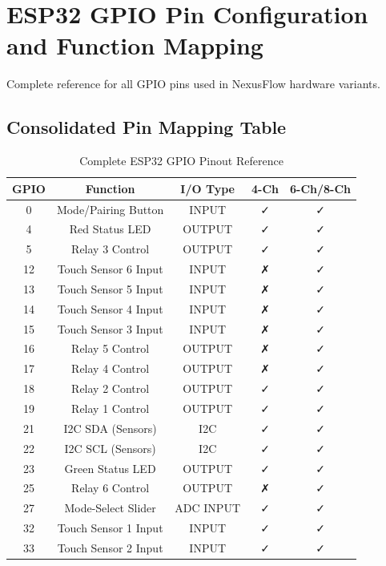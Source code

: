 \section{ESP32 GPIO Pin Configuration and Function Mapping}

Complete reference for all GPIO pins used in NexusFlow hardware variants.

\subsection{Consolidated Pin Mapping Table}

\begin{table}[H]
\centering
\caption{Complete ESP32 GPIO Pinout Reference}
\label{tbl:gpio_reference}
\begin{tabular}{|c|c|c|c|c|}
\hline
\textbf{GPIO} & \textbf{Function} & \textbf{I/O Type} & \textbf{4-Ch} & \textbf{6-Ch/8-Ch} \\
\hline
0 & Mode/Pairing Button & INPUT & ✓ & ✓ \\
\hline
4 & Red Status LED & OUTPUT & ✓ & ✓ \\
\hline
5 & Relay 3 Control & OUTPUT & ✓ & ✓ \\
\hline
12 & Touch Sensor 6 Input & INPUT & ✗ & ✓ \\
\hline
13 & Touch Sensor 5 Input & INPUT & ✗ & ✓ \\
\hline
14 & Touch Sensor 4 Input & INPUT & ✗ & ✓ \\
\hline
15 & Touch Sensor 3 Input & INPUT & ✗ & ✓ \\
\hline
16 & Relay 5 Control & OUTPUT & ✗ & ✓ \\
\hline
17 & Relay 4 Control & OUTPUT & ✗ & ✓ \\
\hline
18 & Relay 2 Control & OUTPUT & ✓ & ✓ \\
\hline
19 & Relay 1 Control & OUTPUT & ✓ & ✓ \\
\hline
21 & I2C SDA (Sensors) & I2C & ✓ & ✓ \\
\hline
22 & I2C SCL (Sensors) & I2C & ✓ & ✓ \\
\hline
23 & Green Status LED & OUTPUT & ✓ & ✓ \\
\hline
25 & Relay 6 Control & OUTPUT & ✗ & ✓ \\
\hline
27 & Mode-Select Slider & ADC INPUT & ✓ & ✓ \\
\hline
32 & Touch Sensor 1 Input & INPUT & ✓ & ✓ \\
\hline
33 & Touch Sensor 2 Input & INPUT & ✓ & ✓ \\
\hline
\end{tabular}
\end{table}

